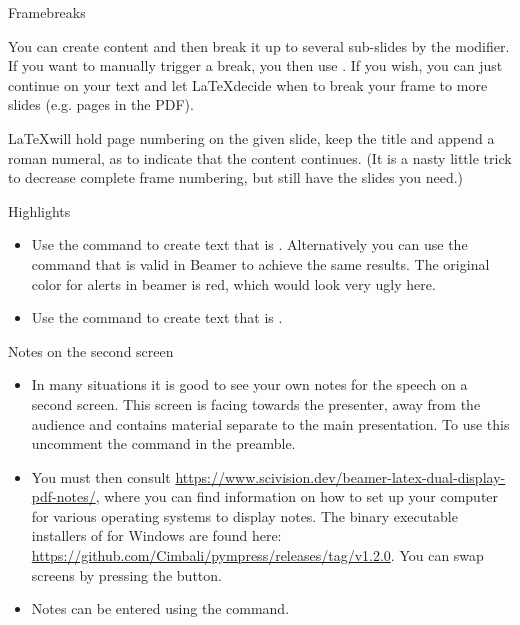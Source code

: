 \documentclass{beamer}                              %
\begin{document}
\begin{frame}[allowframebreaks]{Framebreaks}

You can create content and then break it up to several sub-slides by the  modifier. If you want to manually trigger a break, you then use . If you wish, you can just continue on your text and let \LaTeX decide when to break your frame to more slides (e.g. pages in the PDF).

\framebreak

\LaTeX will hold page numbering on the given slide, keep the title and append a roman numeral, as to indicate that the content continues. (It is a nasty little trick to decrease complete frame numbering, but still have the slides you need.)

\end{frame}

\begin{frame}{Highlights}
\begin{itemize}
\item Use the  command to create text that is . Alternatively you can use the  command that is valid in Beamer to \alert{achieve the same results}. The original color for alerts in beamer is red, which would look very ugly here.
\item Use the  command to create text that is .
\end{itemize}
\end{frame}

\begin{frame}{Notes on the second screen}
\begin{itemize}
\item In many situations it is good to see your own notes for the speech on a second screen. This screen is facing towards the presenter, away from the audience and contains material separate to the main presentation. To use this uncomment the  command in the preamble.

\item You must then consult \url{https://www.scivision.dev/beamer-latex-dual-display-pdf-notes/}, where you can find information on how to set up your computer for various operating systems to display notes. The binary executable installers of  for Windows are found here: \url{https://github.com/Cimbali/pympress/releases/tag/v1.2.0}. You can swap screens by pressing the  button.

\item Notes can be entered using the  command.

\end{itemize}


\end{frame}
\end{document}
